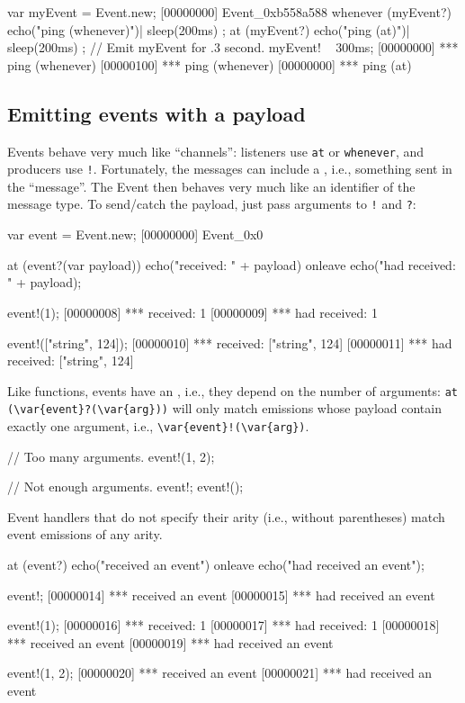 \begin{urbiunchecked}[firstnumber=1]
var myEvent = Event.new;
[00000000] Event_0xb558a588
whenever (myEvent?)
{
  echo("ping (whenever)")|
  sleep(200ms)
};
at (myEvent?)
{
  echo("ping (at)")|
  sleep(200ms)
};
// Emit myEvent for .3 second.
myEvent! ~ 300ms;
[00000000] *** ping (whenever)
[00000100] *** ping (whenever)
[00000000] *** ping (at)
\end{urbiunchecked}

\subsection{Emitting events with a payload}
\label{sec:tut:events:payload}

Events behave very much like ``channels'': listeners use \lstinline|at| or
\lstinline|whenever|, and producers use \lstinline|!|.  Fortunately, the
messages can include a , i.e., something sent in the
``message''.  The Event then behaves very much like an identifier of the
message type.  To send/catch the payload, just pass arguments to
\lstinline|!| and \lstinline|?|:

\begin{urbiscript}
var event = Event.new;
[00000000] Event_0x0

at (event?(var payload))
  echo("received: " + payload)
onleave
  echo("had received: " + payload);

event!(1);
[00000008] *** received: 1
[00000009] *** had received: 1

event!(["string", 124]);
[00000010] *** received: ["string", 124]
[00000011] *** had received: ["string", 124]
\end{urbiscript}

Like functions, events have an , i.e., they depend on the number
of arguments: \lstinline|at (\var{event}?(\var{arg}))| will only match
emissions whose payload contain exactly one argument, i.e.,
\lstinline|\var{event}!(\var{arg})|.

\begin{urbiscript}
// Too many arguments.
event!(1, 2);

// Not enough arguments.
event!;
event!();
\end{urbiscript}

Event handlers that do not specify their arity (i.e., without parentheses)
match event emissions of any arity.

\begin{urbiscript}
at (event?)
  echo("received an event")
onleave
  echo("had received an event");

event!;
[00000014] *** received an event
[00000015] *** had received an event

event!(1);
[00000016] *** received: 1
[00000017] *** had received: 1
[00000018] *** received an event
[00000019] *** had received an event

event!(1, 2);
[00000020] *** received an event
[00000021] *** had received an event
\end{urbiscript}

